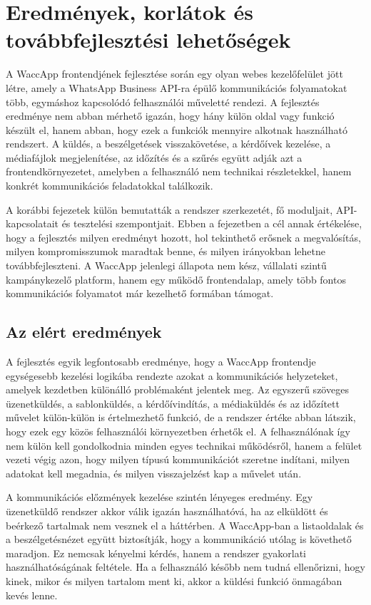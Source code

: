 \chapter{Eredmények, korlátok és továbbfejlesztési lehetőségek}

A WaccApp frontendjének fejlesztése során egy olyan webes kezelőfelület jött létre, amely a WhatsApp Business API-ra épülő kommunikációs folyamatokat több, egymáshoz kapcsolódó felhasználói műveletté rendezi. A fejlesztés eredménye nem abban mérhető igazán, hogy hány külön oldal vagy funkció készült el, hanem abban, hogy ezek a funkciók mennyire alkotnak használható rendszert. A küldés, a beszélgetések visszakövetése, a kérdőívek kezelése, a médiafájlok megjelenítése, az időzítés és a szűrés együtt adják azt a frontendkörnyezetet, amelyben a felhasználó nem technikai részletekkel, hanem konkrét kommunikációs feladatokkal találkozik.

A korábbi fejezetek külön bemutatták a rendszer szerkezetét, fő moduljait, API-kapcsolatait és tesztelési szempontjait. Ebben a fejezetben a cél annak értékelése, hogy a fejlesztés milyen eredményt hozott, hol tekinthető erősnek a megvalósítás, milyen kompromisszumok maradtak benne, és milyen irányokban lehetne továbbfejleszteni. A WaccApp jelenlegi állapota nem kész, vállalati szintű kampánykezelő platform, hanem egy működő frontendalap, amely több fontos kommunikációs folyamatot már kezelhető formában támogat.

\section{Az elért eredmények}

A fejlesztés egyik legfontosabb eredménye, hogy a WaccApp frontendje egységesebb kezelési logikába rendezte azokat a kommunikációs helyzeteket, amelyek kezdetben különálló problémaként jelentek meg. Az egyszerű szöveges üzenetküldés, a sablonküldés, a kérdőívindítás, a médiaküldés és az időzített művelet külön-külön is értelmezhető funkció, de a rendszer értéke abban látszik, hogy ezek egy közös felhasználói környezetben érhetők el. A felhasználónak így nem külön kell gondolkodnia minden egyes technikai működésről, hanem a felület vezeti végig azon, hogy milyen típusú kommunikációt szeretne indítani, milyen adatokat kell megadnia, és milyen visszajelzést kap a művelet után.

A kommunikációs előzmények kezelése szintén lényeges eredmény. Egy üzenetküldő rendszer akkor válik igazán használhatóvá, ha az elküldött és beérkező tartalmak nem vesznek el a háttérben. A WaccApp-ban a listaoldalak és a beszélgetésnézet együtt biztosítják, hogy a kommunikáció utólag is követhető maradjon. Ez nemcsak kényelmi kérdés, hanem a rendszer gyakorlati használhatóságának feltétele. Ha a felhasználó később nem tudná ellenőrizni, hogy kinek, mikor és milyen tartalom ment ki, akkor a küldési funkció önmagában kevés lenne.

